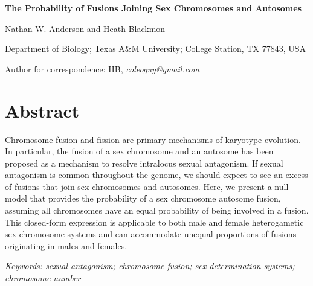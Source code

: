 \documentclass[12pt]{article}
\begin{document}


\begin{center}
\textbf{The Probability of Fusions Joining Sex Chromosomes and Autosomes}

Nathan W. Anderson and Heath Blackmon
\end{center}

\noindent
Department of Biology; Texas A\&M University; College Station, TX 77843, USA

\noindent
Author for correspondence: HB, \textit{coleoguy@gmail.com}







\section{Abstract}

Chromosome fusion and fission are primary mechanisms of karyotype evolution. 
In particular, the fusion of a sex chromosome and an autosome has been proposed as a mechanism to resolve intralocus sexual antagonism.
If sexual antagonism is common throughout the genome, we should expect to see an excess of fusions that join sex chromosomes and autosomes.
Here, we present a null model that provides the probability of a sex chromosome autosome fusion, assuming all chromosomes have an equal probability of being involved in a fusion.
This closed-form expression is applicable to both male and female heterogametic sex chromosome systems and can accommodate unequal proportions of fusions originating in males and females.


\bigskip
\noindent
\textit{Keywords: sexual antagonism; chromosome fusion; sex determination systems; chromosome number}


\clearpage



\linenumbers
\end{document}
